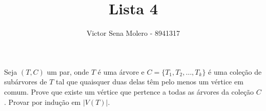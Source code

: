 \documentclass[12pt]{article}
\newenvironment{problem}[2][Ex]{\begin{trivlist}
\item[\hskip \labelsep {\bfseries #1}\hskip \labelsep {\bfseries #2.}]}{\end{trivlist}}
\begin{document}
 
 
\title{Lista 4}
\author{Victor Sena Molero - 8941317}
\maketitle

\begin{problem}{17}
Seja $(T,C)$ um par, onde $T$ é uma árvore e $C = \{T_1, T_2, \dots, T_k\}$ é uma coleção de subárvores de $T$ tal que quaisquer duas delas têm pelo menos um vértice em comum. Prove que existe um vértice que pertence a todas as árvores da coleção $C$. Provar por indução em $|V(T)|$.
\end{problem}
\end{document}
